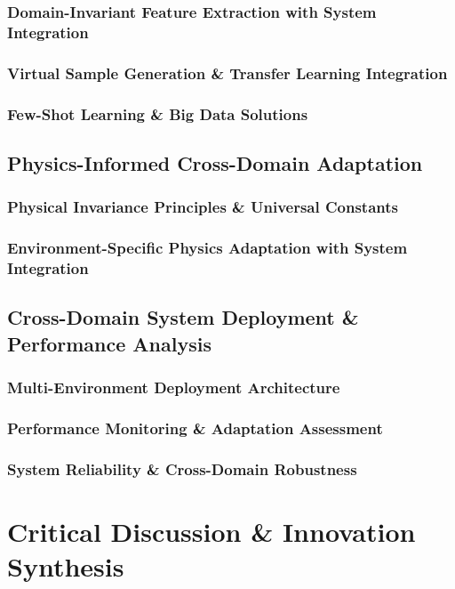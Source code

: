 \documentclass[journal]{IEEEtran}
\begin{document}
\subsubsection{Domain-Invariant Feature Extraction with System Integration}
\subsubsection{Virtual Sample Generation \& Transfer Learning Integration}
\subsubsection{Few-Shot Learning \& Big Data Solutions}

\subsection{Physics-Informed Cross-Domain Adaptation}
\subsubsection{Physical Invariance Principles \& Universal Constants}
\subsubsection{Environment-Specific Physics Adaptation with System Integration}

\subsection{Cross-Domain System Deployment \& Performance Analysis}
\subsubsection{Multi-Environment Deployment Architecture}
\subsubsection{Performance Monitoring \& Adaptation Assessment}
\subsubsection{System Reliability \& Cross-Domain Robustness}

\section{Critical Discussion \& Innovation Synthesis}
\label{sec:discussion}
\end{document}
